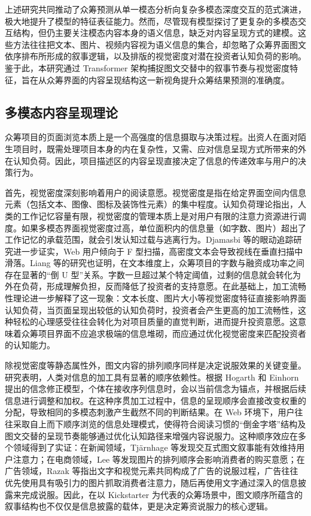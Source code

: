 上述研究共同推动了众筹预测从单一模态分析向复杂多模态深度交互的范式演进，极大地提升了模型的特征表征能力。然而，尽管现有模型探讨了更复杂的多模态交互结构，但仍主要关注模态内容本身的语义信息，缺乏对内容呈现方式的建模。这些方法往往把文本、图片、视频内容视为语义信息的集合，却忽略了众筹界面图文依序排布所形成的叙事逻辑，以及排版的视觉密度对潜在投资者认知负荷的影响。鉴于此，本研究通过 Transformer 架构捕捉图文交替中的叙事节奏与视觉密度特征，旨在从众筹界面的内容呈现结构这一新视角提升众筹结果预测的准确度。

\subsection{多模态内容呈现理论}
众筹项目的页面浏览本质上是一个高强度的信息摄取与决策过程。出资人在面对陌生项目时，既需处理项目本身的内在复杂性，又需、应对信息呈现方式所带来的外在认知负荷。因此，项目描述区的内容呈现直接决定了信息的传递效率与用户的决策行为。

首先，视觉密度深刻影响着用户的阅读意愿。视觉密度是指在给定界面空间内信息元素（包括文本、图像、图标及装饰性元素）的集中程度。认知负荷理论指出，人类的工作记忆容量有限，视觉密度的管理本质上是对用户有限的注意力资源进行调度。如果多模态界面视觉密度过高，单位面积内的信息量（如字数、图片）超出了工作记忆的承载范围，就会引发认知过载与逃离行为\cite{ref30,ref31,ref32}。Djamasbi 等的眼动追踪研究进一步证实，Web 用户倾向于 F 型扫描，高密度文本会导致视线在垂直扫描中滑落\cite{ref33}。Liang 等的研究也证明，在文本维度上，众筹项目的字数与融资成功率之间存在显著的“倒 U 型”关系\cite{ref34}。字数一旦超过某个特定阈值，过剩的信息就会转化为外在负荷，形成理解负担，反而降低了投资者的支持意愿。在此基础上，加工流畅性理论进一步解释了这一现象\cite{ref35}：文本长度、图片大小等视觉密度特征直接影响界面认知负荷，当页面呈现出较低的认知负荷时，投资者会产生更高的加工流畅性，这种轻松的心理感受往往会转化为对项目质量的直觉判断，进而提升投资意愿。这意味着众筹项目界面不应追求极端的信息堆砌，而应通过优化视觉密度来匹配投资者的认知能力。

除视觉密度等静态属性外，图文内容的排列顺序同样是决定说服效果的关键变量。研究表明，人类对信息的加工具有显著的顺序依赖性。根据 Hogarth 和 Einhorn 提出的信念修正模型\cite{ref36}，个体在接收序列信息时，会以当前信念为锚点，并根据后续信息进行调整和加权。在这种序贯加工过程中，信息的呈现顺序会直接改变权重的分配，导致相同的多模态刺激产生截然不同的判断结果。在 Web 环境下，用户往往采取自上而下顺序浏览的信息处理模式，使得符合阅读习惯的“倒金字塔”结构及图文交替的呈现节奏能够通过优化认知路径来增强内容说服力\cite{ref37}。这种顺序效应在多个领域得到了实证：在新闻领域，Tjärnhage 等发现交互式图文叙事能有效维持用户注意力\cite{ref38}；在电商领域，Lee 等发现图片的排列顺序会影响消费者的购买意愿\cite{ref39,ref40}；在广告领域，Razak 等指出文字和视觉元素共同构成了广告的说服过程，广告往往优先使用具有吸引力的图片抓取消费者注意力，随后再使用文字通过深入的信息披露来完成说服\cite{ref41}。因此，在以 Kickstarter 为代表的众筹场景中，图文顺序所蕴含的叙事结构也不仅仅是信息披露的载体，更是决定筹资说服力的核心逻辑。

